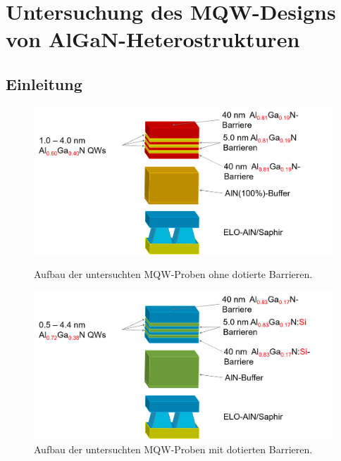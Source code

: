 \thispagestyle{fancy}
\justifying

\chapter{Untersuchung des MQW-Designs von AlGaN-Heterostrukturen}
\label{chap:mqw}
\section{Einleitung}


%
\begin{figure}[H]
  \centering
  \begin{minipage}[t]{0.49\textwidth}
    \centering
    \includegraphics[width=\textwidth]{Bilder/MQWdickenSerie/undotiert}
		\caption{Aufbau der untersuchten MQW-Proben ohne dotierte Barrieren.}
    \label{fig:undotiert}
  \end{minipage}
	\hfill
  \begin{minipage}[t]{0.49\textwidth}
    \centering
    \includegraphics[width=\linewidth]{Bilder/MQWdickenSerie/dotiert}
		\caption{Aufbau der untersuchten MQW-Proben mit dotierten Barrieren.}
    \label{fig:dotiert}
  \end{minipage}
\end{figure}
\noindent 
